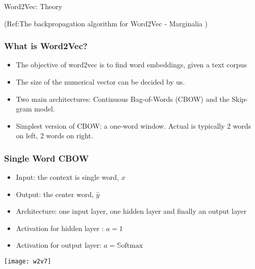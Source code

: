 \begin{frame}[fragile]\frametitle{}

\begin{center}
{\Large Word2Vec: Theory}

{\tiny (Ref:The backpropagation algorithm for Word2Vec - Marginalia )}

\end{center}

\end{frame}

\begin{frame}[fragile]\frametitle{What is Word2Vec?}
  \begin{itemize}
    \item The objective of word2vec is to find word embeddings, given a text corpus
	\item The size of the numerical vector can be decided by us.
	\item Two main architectures: Continuous Bag-of-Words (CBOW) and the Skip-gram model. 
	\item Simplest version of CBOW: a one-word window. Actual is typically 2 words on left, 2 words on right.
  \end{itemize}


\end{frame}

\begin{frame}[fragile]\frametitle{Single Word CBOW}
  \begin{itemize}
    \item Input: the context is single word, $x$
	\item Output: the center word, $\hat{y}$
	\item Architecture: one input layer, one hidden layer and finally an output layer
	\item Activation for hidden layer : $a=1$
	\item Activation for output layer: $a=\mathbb{S}\textrm{oftmax}$
  \end{itemize}
  
\begin{center}
\texttt{[image: w2v7]}
\end{center}
\end{frame}

